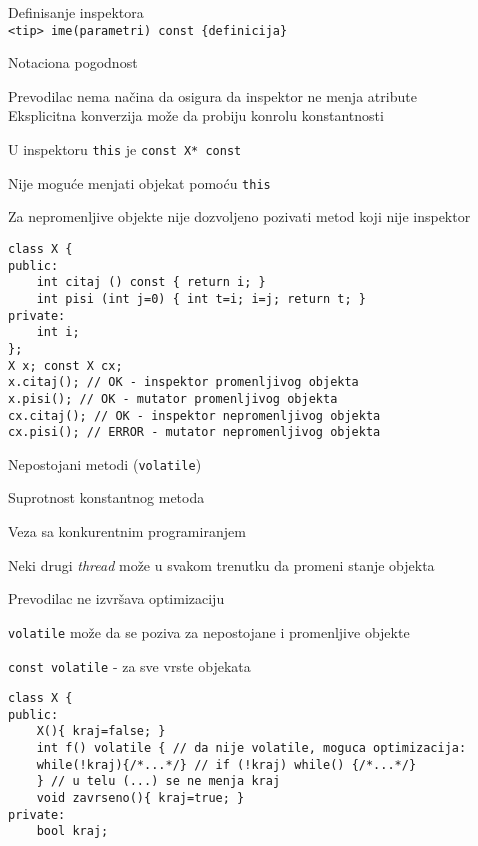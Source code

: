 \documentclass{article}
\newenvironment{xitemize}{%
    
    \itemize
    \larger
}{%
    \enditemize
}
\let\olditemize\itemize
\let\endolditemize\enditemize
\renewenvironment{itemize}{%
    \smaller
    \olditemize
}{%
    \endolditemize
}
\providecommand{\inlinecode}[1]{\texttt{#1}}
\begin{document}
\begin{xitemize}
\item Definisanje inspektora\\
\inlinecode{<tip> ime(parametri) const \{definicija\}}
\begin{itemize}
    \item Notaciona pogodnost
    \item Prevodilac nema načina da osigura da inspektor ne menja atribute\\ Eksplicitna konverzija može da probiju konrolu konstantnosti
    \item U inspektoru \inlinecode{this} je \inlinecode{const X* const} 
    \item Nije moguće menjati objekat pomoću \inlinecode{this}
    \item Za nepromenljive objekte nije dozvoljeno pozivati metod koji nije inspektor
    \begin{lstlisting}
class X {
public:
    int citaj () const { return i; }
    int pisi (int j=0) { int t=i; i=j; return t; }
private:
    int i;
};
X x; const X cx;
x.citaj(); // OK - inspektor promenljivog objekta
x.pisi(); // OK - mutator promenljivog objekta
cx.citaj(); // OK - inspektor nepromenljivog objekta
cx.pisi(); // ERROR - mutator nepromenljivog objekta
    \end{lstlisting}
\end{itemize}
\newpage
\item Nepostojani metodi (\inlinecode{volatile})
\begin{itemize}
    \item Suprotnost konstantnog metoda
    \item Veza sa konkurentnim programiranjem
    \item Neki drugi \textit{thread} može u svakom trenutku da promeni stanje objekta
    \item Prevodilac ne izvršava optimizaciju
    \item \inlinecode{volatile} može da se poziva za nepostojane i promenljive objekte
    \item \inlinecode{const volatile} - za sve vrste objekata
    \begin{lstlisting}
class X {
public:
    X(){ kraj=false; }
    int f() volatile { // da nije volatile, moguca optimizacija:
    while(!kraj){/*...*/} // if (!kraj) while() {/*...*/}
    } // u telu (...) se ne menja kraj
    void zavrseno(){ kraj=true; }
private:
    bool kraj;
    \end{lstlisting}
\end{itemize}


\end{xitemize}
\end{document}
